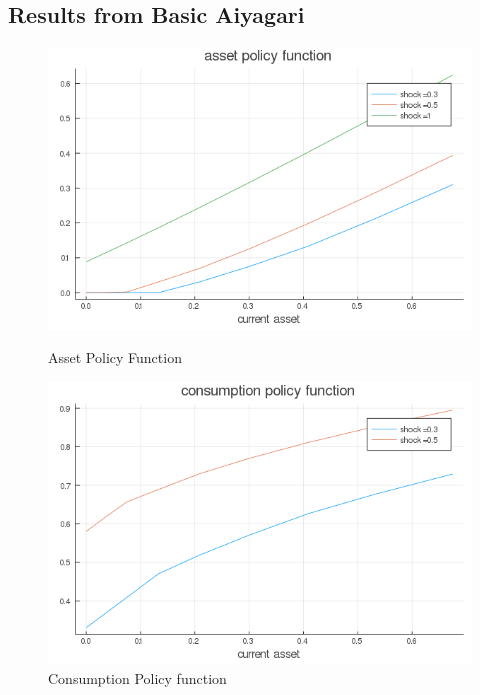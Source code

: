 \documentclass[12pt]{article}
\begin{document}
\subsection{Results from Basic Aiyagari}
\begin{figure}[h]
    \centering
    \begin{minipage}{0.45\textwidth}
        \centering
        \includegraphics[width=1\textwidth]{A_p_basic.png} %
        \caption{Asset Policy Function}
    \end{minipage}\hfill
    \begin{minipage}{0.45\textwidth}
        \centering
        \includegraphics[width=1\textwidth]{C_basic.png} %
        \caption{Consumption Policy function}
    \end{minipage}
\end{figure}
\end{document}
